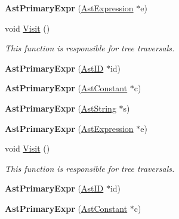 \begin{DoxyCompactItemize}
\item 
\hypertarget{classAstPrimaryExpr_a75b1363ac6a376ea3de63e03700072d8}{{\bfseries Ast\-Primary\-Expr} (\hyperlink{classAstExpression}{Ast\-Expression} $\ast$e)}\label{classAstPrimaryExpr_a75b1363ac6a376ea3de63e03700072d8}

\item 
void \hyperlink{classAstPrimaryExpr_adfc316933183cada2963b7b855ddb824}{Visit} ()
\begin{DoxyCompactList}\small\item\em This function is responsible for tree traversals. \end{DoxyCompactList}\item 
\hypertarget{classAstPrimaryExpr_a92ac6a98d42e522c7476768c959e2044}{{\bfseries Ast\-Primary\-Expr} (\hyperlink{classAstID}{Ast\-I\-D} $\ast$id)}\label{classAstPrimaryExpr_a92ac6a98d42e522c7476768c959e2044}

\item 
\hypertarget{classAstPrimaryExpr_a03809c945a11ab5345f50956cff84f82}{{\bfseries Ast\-Primary\-Expr} (\hyperlink{classAstConstant}{Ast\-Constant} $\ast$c)}\label{classAstPrimaryExpr_a03809c945a11ab5345f50956cff84f82}

\item 
\hypertarget{classAstPrimaryExpr_a784c92261d262fe4952963af0dd891e7}{{\bfseries Ast\-Primary\-Expr} (\hyperlink{classAstString}{Ast\-String} $\ast$s)}\label{classAstPrimaryExpr_a784c92261d262fe4952963af0dd891e7}

\item 
\hypertarget{classAstPrimaryExpr_a75b1363ac6a376ea3de63e03700072d8}{{\bfseries Ast\-Primary\-Expr} (\hyperlink{classAstExpression}{Ast\-Expression} $\ast$e)}\label{classAstPrimaryExpr_a75b1363ac6a376ea3de63e03700072d8}

\item 
void \hyperlink{classAstPrimaryExpr_adfc316933183cada2963b7b855ddb824}{Visit} ()
\begin{DoxyCompactList}\small\item\em This function is responsible for tree traversals. \end{DoxyCompactList}\item 
\hypertarget{classAstPrimaryExpr_a92ac6a98d42e522c7476768c959e2044}{{\bfseries Ast\-Primary\-Expr} (\hyperlink{classAstID}{Ast\-I\-D} $\ast$id)}\label{classAstPrimaryExpr_a92ac6a98d42e522c7476768c959e2044}

\item 
\hypertarget{classAstPrimaryExpr_a03809c945a11ab5345f50956cff84f82}{{\bfseries Ast\-Primary\-Expr} (\hyperlink{classAstConstant}{Ast\-Constant} $\ast$c)}\label{classAstPrimaryExpr_a03809c945a11ab5345f50956cff84f82}


\end{DoxyCompactItemize}
